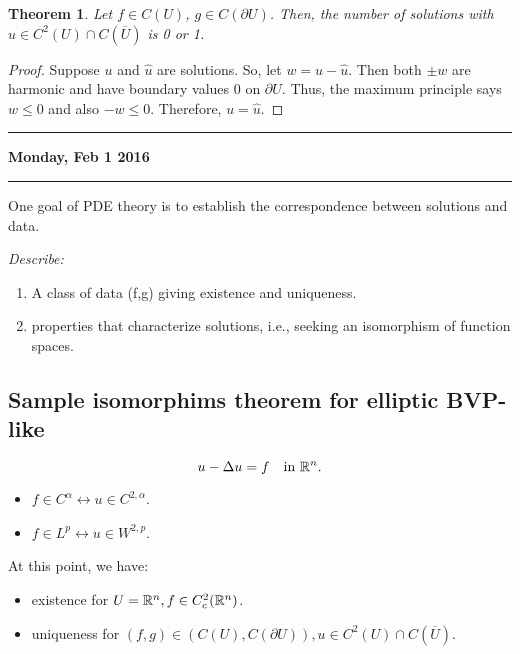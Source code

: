 \documentclass[11pt]{amsart}%
\newtheorem{theorem}{Theorem}
\begin{document}
\begin{theorem}
    Let $f\in C(U)$, $g\in C(\partial U)$. Then, the number of solutions with $u\in C^2(U)\cap C(\overline{U})$ is 0 or 1.
\end{theorem}
\begin{proof}
    Suppose $u$ and $\hat{u}$ are solutions. So, let $w=u-\hat{u}$. Then both $\pm w$ are harmonic and have boundary values 0 on $\partial U$. Thus, the maximum principle says $w\le 0$ and also $-w\le 0$. Therefore, $u=\hat{u}$.
\end{proof}

\begin{center}\rule{0.5\linewidth}{\linethickness}\end{center}

\textbf{Monday, Feb 1 2016}

\begin{center}\rule{0.5\linewidth}{\linethickness}\end{center}

One goal of PDE theory is to establish the correspondence between solutions and data.

\emph{Describe:}
\begin{enumerate}
    \item A class of data (f,g) giving existence and uniqueness.
    \item properties that characterize solutions, i.e., seeking an isomorphism of function spaces.
\end{enumerate}

\subsection*{Sample isomorphims theorem for elliptic BVP-like}

$$u-\Delta u=f \quad \text{in $\mathbb{R}^n$}.$$
\begin{itemize}
    \item $f\in C^\alpha \leftrightarrow u\in C^{2,\alpha}$.
    \item $f\in L^p \leftrightarrow u\in W^{2,p}$.
\end{itemize}

At this point, we have:
\begin{itemize}
    \item existence for $U=\mathbb{R}^n, f\in C^2_c(\mathbb{R}^n)$.
    \item uniqueness for $(f,g)\in (C(U),C(\partial U)), u\in C^2(U)\cap C(\overline{U})$.
\end{itemize}
\end{document}
